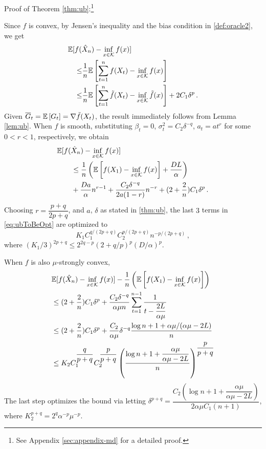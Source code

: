 Proof of Theorem \ref{thm:ub}:\footnote{See Appendix \ref{sec:appendix-md} for a detailed proof.}

Since $f$ is convex, by Jensen's inequality and the bias condition in \cref{def:oracle2}, we get
\begin{align*}
\MoveEqLeft
 \E[f(\hat X_n) - \inf_{x \in \cK} f(x)] \\
 \le&  
 \dfrac{1}{n}\EE{ \sum_{t=1}^n f(X_t) - \inf_{x \in \cK}f(x) } \\
 \le &\dfrac{1}{n}\EE{ \sum_{t=1}^n \tilde{f}(X_t) - \inf_{x \in \cK}\tilde{f}(x) } +2C_1 \delta^p
 \,.
\end{align*}
Given $\overline{G}_t=\mathbb{E}\left[G_t\right] = \nabla \tilde{f}(X_t)$,
the result immediately follows from Lemma \ref{lem:ub}. 
When $f$ is smooth,
substituting
 $\beta_t = 0$, $\sigma^2_t = C_2 \delta^{-q}$, $a_t=a t^r$ for some $0<r<1$, respectively, we obtain
 \begin{align}
 \MoveEqLeft
 \E[f(\hat X_n) - \inf_{x \in \cK} f(x)]  \nonumber\\
&\le \dfrac{1}{n}\left(\EE{f(X_1)-\inf_{x \in \cK}f(x)}+\dfrac{DL}{\alpha}  \right)\nonumber\\
&+\dfrac{Da}{\alpha} n^{r-1}+\dfrac{C_2 \delta^{-q}}{2a(1-r)}n^{-r}+ (2+\dfrac{2}{n})C_1\delta^p \,.
\label{eq:ubToBeOpt}
 \end{align}
 Choosing $r = \dfrac{p+q}{2p+q}$, and $a$, $\delta$ as stated in \cref{thm:ub}, the last $3$ terms in \eqref{eq:ubToBeOpt} are optimized to
 \[
 K_1 C_1^{q/(2p+q)} C_2^{p/(2p+q)} n ^{-p/(2p+q)} \,,
 \]
 where 
 $(K_1/3)^{2p+q} \le 2^{2q-p}\left(2+q/p \right)^p \left(D/\alpha\right)^{p}$.
 
 When $f$ is also $\mu$-strongly convex,
 \begin{align*}
& \mathbb{E}[f(\hat X_n) - \inf_{x \in \mathcal{K}} f(x)] -\dfrac{1}{n}\left(\mathbb{E}\left[f(X_1)-\inf_{x \in \mathcal{K}}f(x)\right]\right)\\
&\le (2+\dfrac{2}{n})C_1\delta^p+\dfrac{C_2 \delta^{-q}}{\alpha \mu n} \sum_{t=1}^{n-1}\dfrac{1}{t-\dfrac{2L}{\alpha \mu}}\\
&\le (2+\dfrac{2}{n})C_1\delta^p+\dfrac{C_2 }{\alpha \mu}\delta^{-q} \dfrac{\log n+1+\alpha \mu/(\alpha \mu-2L)}{n}\\
&\le K_2C_1^{\dfrac{q}{p+q}}C_2^{\dfrac{p}{p+q}} \left( \dfrac{\log n+1+\dfrac{\alpha \mu}{\alpha \mu -2L}}{n} \right)^{\dfrac{p}{p+q}}
 \end{align*}
The last step optimizes the bound via letting 
$\delta^{p+q} =  \dfrac{C_2\left( \log n+1+\dfrac{\alpha \mu}{\alpha \mu -2L}\right)}{2\alpha \mu C_1 (n+1)}$, 
where
$K_2^{p+q}=2^{q}\alpha^{-p}\mu^{-p}$.
